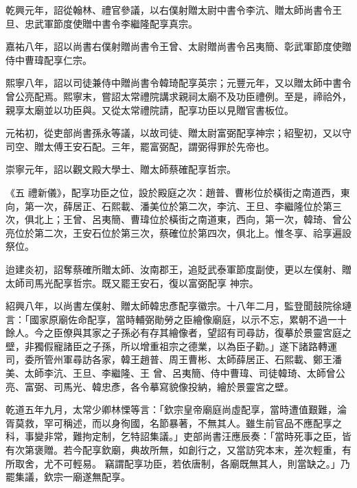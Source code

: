 \begin{pinyinscope}
 乾興元年，詔從翰林、禮官參議，以右僕射贈太尉中書令李沆、贈太師尚書令王旦、忠武軍節度使贈中書令李繼隆配享真宗。



 嘉祐八年，詔以尚書右僕射贈尚書令王曾、太尉贈尚書令呂夷簡、彰武軍節度使贈侍中曹瑋配享仁宗。



 熙寧八年，詔以司徒兼侍中贈尚書令韓琦配享英宗；元豐元年，又以贈太師中書令曾公亮配焉。熙寧末，嘗詔太常禮院講求親祠太廟不及功臣禮例。至是，禘祫外，親享太廟並以功臣與。又從太常禮院請，配享功臣以見贈官書板位。



 元祐初，從吏部尚書孫永等議，以故司徒、贈太尉富弼配享神宗；紹聖初，又以守司空、贈太傅王安石配。三年，罷富弼配，謂弼得罪於先帝也。



 崇寧元年，詔以觀文殿大學士、贈太師蔡確配享哲宗。



 《五
 禮新儀》，配享功臣之位，設於殿庭之次：趙普、曹彬位於橫街之南道西，東向，第一次，薛居正、石熙載、潘美位於第二次，李沆、王旦、李繼隆位於第三次，俱北上；王曾、呂夷簡、曹瑋位於橫街之南道東，西向，第一次，韓琦、曾公亮位於第二次，王安石位於第三次，蔡確位於第四次，俱北上。惟冬享、祫享遍設祭位。



 迨建炎初，詔奪蔡確所贈太師、汝南郡王，追貶武泰軍節度副使，更以左僕射、贈太師司馬光配享哲宗。既又罷王安石，復以富弼配享
 神宗。



 紹興八年，以尚書左僕射、贈太師韓忠彥配享徽宗。十八年二月，監登聞鼓院徐璉言：「國家原廟佐命配享，當時輔弼勛勞之臣繪像廟庭，以示不忘，累朝不過一十餘人。今之臣僚與其家之子孫必有存其繪像者，望詔有司尋訪，復摹於景靈宮庭之壁，非獨假寵諸臣之子孫，所以增重祖宗之德業，以為臣子勸。」遂下諸路轉運司，委所管州軍尋訪各家，韓王趙普、周王曹彬、太師薛居正、石熙載、鄭王潘美、太師李沆、王旦、李繼隆、王
 曾、呂夷簡、侍中曹瑋、司徒韓琦、太師曾公亮、富弼、司馬光、韓忠彥，各令摹寫貌像投納，繪於景靈宮之壁。



 乾道五年九月，太常少卿林慄等言：「欽宗皇帝廟庭尚虛配享，當時遭值艱難，淪胥莫救，罕可稱述，而以身徇國，名節暴著，不無其人。雖生前官品不應配享之科，事變非常，難拘定制，乞特詔集議。」吏部尚書汪應辰奏：「當時死事之臣，皆有次第褒贈。若今配享欽廟，典故所無，如創行之，又當訪究本末，差次輕重，有所取舍，尤不可輕易。
 竊謂配享功臣，若依唐制，各廟既無其人，則當缺之。」乃罷集議，欽宗一廟遂無配享。




\end{pinyinscope}
